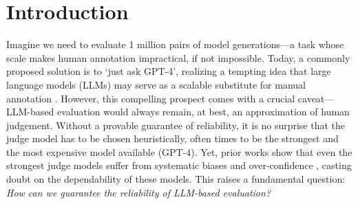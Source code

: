 \section{Introduction}
Imagine we need to evaluate 1 million pairs of model generations---a task whose scale makes human annotation impractical, if not impossible. Today, a commonly proposed solution is to `just ask GPT-4'\citep{mt-bench, alpacafarm}, realizing a tempting idea that large language models (LLMs) may serve as a scalable substitute for manual annotation \citep{can-llms-be-an-alternative}. However, this compelling prospect comes with a crucial caveat---LLM-based evaluation would always remain, at best, an approximation of human judgement. Without a provable guarantee of reliability, it is no surprise that the judge model has to be chosen heuristically, often times to be the strongest and the most expensive model available (\eg GPT-4). Yet, prior works show that even the strongest judge models suffer from systematic biases \citep{LLMs-are-not-fair-evaluators, judging-judges} and over-confidence \citep{confidence-elicitation}, casting doubt on the dependability of these models. This raises a fundamental question: \textit{How can we guarantee the reliability of LLM-based evaluation?}

